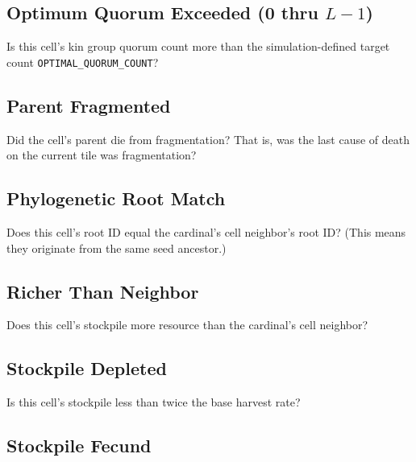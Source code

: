 \subsection{Optimum Quorum Exceeded (0 thru $L-1$)}


Is this cell's kin group quorum count more than the simulation-defined target count \texttt{OPTIMAL\_QUORUM\_COUNT}?

\subsection{Parent Fragmented}


Did the cell's parent die from fragmentation?
That is, was the last cause of death on the current tile was fragmentation?

\subsection{Phylogenetic Root Match}


Does this cell's root ID equal the cardinal's cell neighbor's root ID?
(This means they originate from the same seed ancestor.)

\subsection{Richer Than Neighbor}


Does this cell's stockpile more resource than the cardinal's cell neighbor?

\subsection{Stockpile Depleted}


Is this cell's stockpile less than twice the base harvest rate?

\subsection{Stockpile Fecund}

